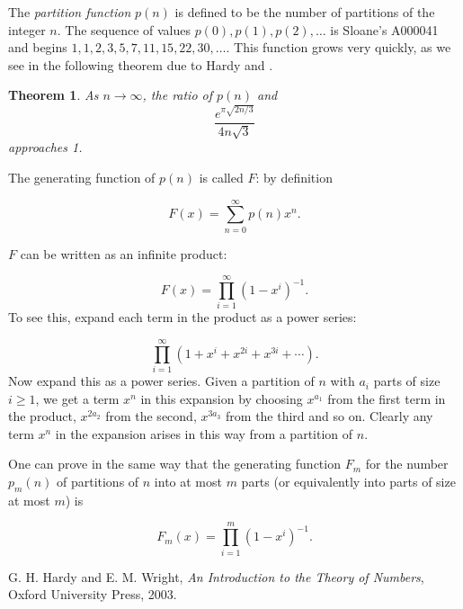 \documentclass[12pt]{article}
\newtheorem{thm}{Theorem}
\begin{document}
The {\sl partition function } $p(n)$ is defined to be the number of partitions of the integer $n$.  The sequence of values $p(0), p(1), p(2),\ldots$ is Sloane's A000041 and begins $1, 1, 2, 3, 5, 7, 11, 15, 22, 30, \ldots$.  This function grows very quickly, as we see in the following theorem due to Hardy and .

\begin{thm}
As $n \rightarrow \infty$, the ratio of $p(n)$ and
\[ \frac{ e^{\pi \sqrt{ 2n/3} } } {4n \sqrt{3} } \]
approaches 1.
\end{thm}


The generating function of $p(n)$ is called $F$: by definition

\[ F(x) = \sum _{n=0} ^\infty p(n) x ^n. \]

$F$ can be written as an infinite product:

\[ F(x) = \prod _{i=1} ^\infty (1-x^i) ^{-1}. \]
To see this, expand each term in the product as a power series:

\[ \label{product} \prod _{i=1} ^\infty  (1+ x^i + x^{2i} + x^{3i} + \cdots ). \]
Now expand this as a power series.  Given a partition of $n$ with $a_i$ parts of size $i \geq 1$, we get a term $x^n$ in this expansion by choosing $x^{a_1}$ from the first term in the product, $x^{2a_2}$ from the second, $x^{3a_3}$ from the third and so on.  Clearly any term $x^n$ in the expansion arises in this way from a partition of $n$.

One can prove in the same way that the generating function $F_m$ for the number $p_m(n)$ of partitions of $n$ into at most $m$ parts (or equivalently into parts of size at most $m$) is

\[ F_m(x) = \prod _{i=1} ^m (1-x^i) ^{-1}. \]

\begin{thebibliography}{5}
 G. H. Hardy and E. M. Wright, {\em An Introduction to the Theory of Numbers}, Oxford University Press, 2003.



\end{thebibliography}
\end{document}
